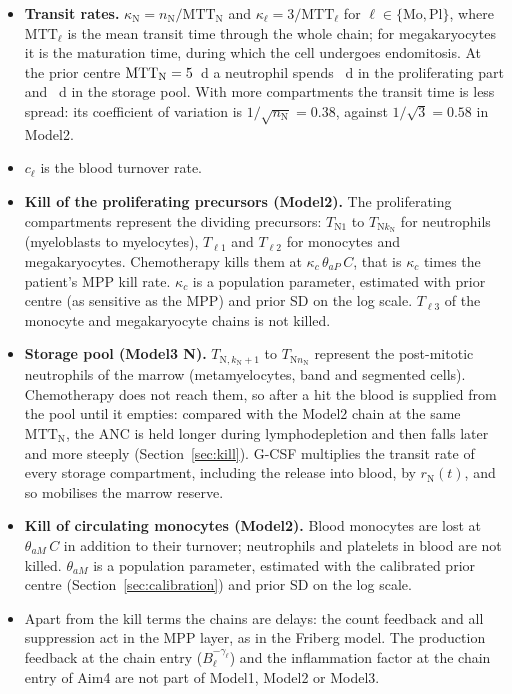 \documentclass[11pt]{article}
\begin{document}
\begin{itemize}
\item \textbf{Transit rates.} $\kappa_{\mathrm{N}}=n_{\mathrm{N}}/\mathrm{MTT}_{\mathrm{N}}$ and $\kappa_\ell=3/\mathrm{MTT}_\ell$ for $\ell\in\{\mathrm{Mo},\mathrm{Pl}\}$, where $\mathrm{MTT}_\ell$ is the mean transit time through the whole chain; for megakaryocytes it is the maturation time, during which the cell undergoes endomitosis. At the prior centre $\mathrm{MTT}_{\mathrm{N}}=5$~d a neutrophil spends \valMttNProl~d in the proliferating part and \valMttNStore~d in the storage pool. With more compartments the transit time is less spread: its coefficient of variation is $1/\sqrt{n_{\mathrm{N}}}=0.38$, against $1/\sqrt3=0.58$ in Model2.
\item $c_\ell$ is the blood turnover rate.
\item \textbf{Kill of the proliferating precursors (Model2).} The proliferating compartments represent the dividing precursors: $T_{\mathrm{N}1}$ to $T_{\mathrm{N}k_{\mathrm{N}}}$ for neutrophils (myeloblasts to myelocytes), $T_{\ell1}$ and $T_{\ell2}$ for monocytes and megakaryocytes. Chemotherapy kills them at $\kappa_c\,\theta_{aP}\,C$, that is $\kappa_c$ times the patient's MPP kill rate. $\kappa_c$ is a population parameter, estimated with prior centre \valKappaC{} (as sensitive as the MPP) and prior SD \valKappaCSd{} on the log scale. $T_{\ell3}$ of the monocyte and megakaryocyte chains is not killed.
\item \textbf{Storage pool (Model3 N).} $T_{\mathrm{N},k_{\mathrm{N}}+1}$ to $T_{\mathrm{N}n_{\mathrm{N}}}$ represent the post-mitotic neutrophils of the marrow (metamyelocytes, band and segmented cells). Chemotherapy does not reach them, so after a hit the blood is supplied from the pool until it empties: compared with the Model2 chain at the same $\mathrm{MTT}_{\mathrm{N}}$, the ANC is held longer during lymphodepletion and then falls later and more steeply (Section~\ref{sec:kill}). G-CSF multiplies the transit rate of every storage compartment, including the release into blood, by $r_{\mathrm{N}}(t)$, and so mobilises the marrow reserve.
\item \textbf{Kill of circulating monocytes (Model2).} Blood monocytes are lost at $\theta_{aM}\,C$ in addition to their turnover; neutrophils and platelets in blood are not killed. $\theta_{aM}$ is a population parameter, estimated with the calibrated prior centre \valThAm{} (Section~\ref{sec:calibration}) and prior SD \valThAmSd{} on the log scale.
\item Apart from the kill terms the chains are delays: the count feedback and all suppression act in the MPP layer, as in the Friberg model. The production feedback at the chain entry ($B_\ell^{-\gamma_\ell}$) and the inflammation factor at the chain entry of Aim4 are not part of Model1, Model2 or Model3.

\end{itemize}
\end{document}
